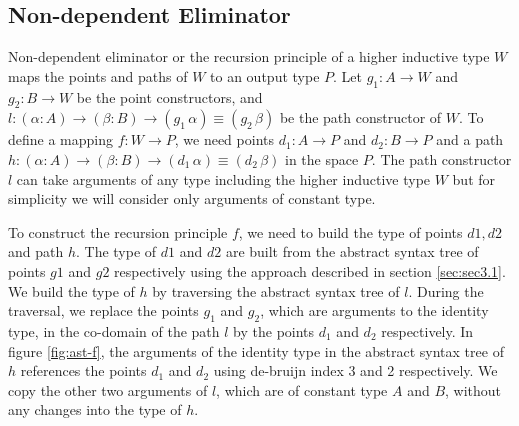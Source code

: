 \documentclass[sigplan,10pt]{acmart}
\begin{document}
\subsection{Non-dependent Eliminator}
\label{sec:sec4.2}

Non-dependent eliminator or the recursion principle of a higher inductive type $W$ maps the points and paths of $W$ to an output type $P$. Let $g_1 : A \rightarrow W$ and $g_2 : B \rightarrow W$ be the point constructors, and $l : (\alpha : A) \rightarrow (\beta : B) \rightarrow (g_1 \, \alpha) \equiv (g_2 \, \beta)$ be the path constructor of $W$. To define a mapping $f : W \rightarrow P$, we need points $d_1 : A \rightarrow P$ and $d_2 : B \rightarrow P$ and a path $h : (\alpha : A) \rightarrow (\beta : B) \rightarrow (d_1 \, \alpha) \equiv (d_2 \, \beta)$ in the space $P$. The path constructor $l$ can take arguments of any type including the higher inductive type $W$ but for simplicity we will consider only arguments of constant type.

To construct the recursion principle $f$, we need to build the type of points $d1, d2$ and path $h$. The type of $d1$ and $d2$ are built from the abstract syntax tree of points $g1$ and $g2$ respectively using the approach described in section \eqref{sec:sec3.1}. We build the type of $h$ by traversing the abstract syntax tree of $l$. During the traversal, we replace the points $g_1$ and $g_2$, which are arguments to the identity type, in the co-domain of the path $l$ by the points $d_1$ and $d_2$ respectively. In figure \eqref{fig:ast-f}, the arguments of the identity type in the abstract syntax tree of $h$ references the points $d_1$ and $d_2$ using de-bruijn index 3 and 2 respectively. We copy the other two arguments of $l$, which are of constant type $A$ and $B$, without any changes into the type of $h$.
\end{document}
